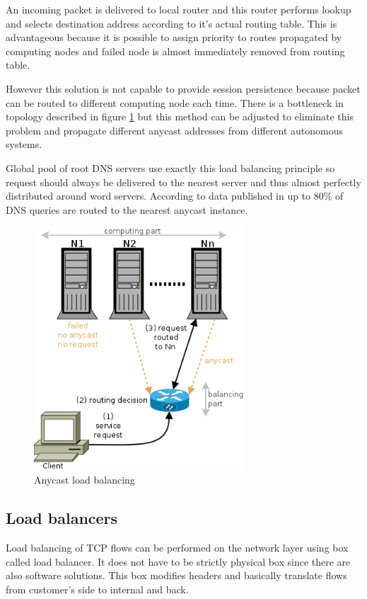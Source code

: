 An incoming packet is delivered to local router and this router performs lookup and selects destination address according to it's actual routing table. This is advantageous because it is possible to assign priority to routes propagated by computing nodes and failed node is almost immediately removed from routing table.

However this solution is not capable to provide session persistence because packet can be routed to different computing node each time. There is a bottleneck in topology described in figure \ref{img:anycast-balancing} but this method can be adjusted to eliminate this problem and propagate different anycast addresses from different autonomous systems.

Global pool of root \Ac{DNS} servers use exactly this load balancing principle so request should always be delivered to the nearest server and thus almost perfectly distributed around word servers. According to data published in \cite{dns-anycast} up to 80\% of \Ac{DNS} queries are routed to the nearest anycast instance.

\begin{figure}[htb]
	\begin{center}
	\includegraphics[width=0.7\textwidth]{balancing-anycast.png}
	\end{center}
	\caption{Anycast load balancing}
	\label{img:anycast-balancing}
\end{figure}

\subsection{Load balancers}
Load balancing of \Ac{TCP} flows can be performed on the network layer using box called load balancer. It does not have to be strictly physical box since there are also software solutions. This box modifies headers and basically translate flows from customer's side to internal and back. 

